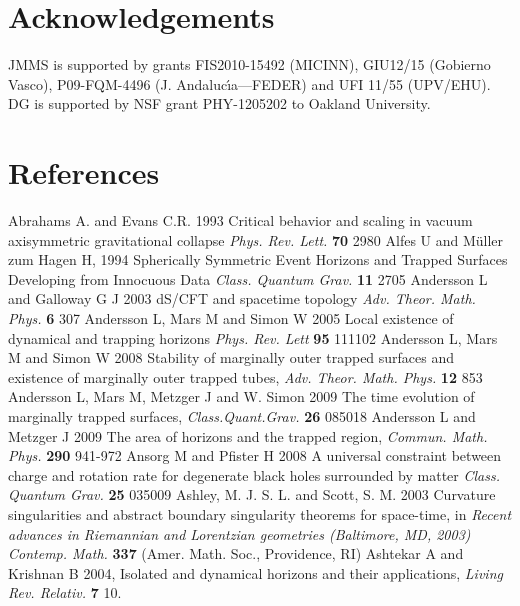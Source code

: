 \documentclass[12pt]{iopart}
\begin{document}
 



\section*{Acknowledgements}
 JMMS is supported by grants
FIS2010-15492 (MICINN), GIU12/15 (Gobierno Vasco), P09-FQM-4496 (J. Andaluc\'{\i}a---FEDER) and UFI 11/55 (UPV/EHU).
DG is supported by NSF grant PHY-1205202 to Oakland University.

\section*{References}
\begin{thebibliography}{999}

 Abrahams A. and Evans C.R. 1993 Critical behavior and scaling in vacuum axisymmetric gravitational collapse {\it Phys. Rev. Lett.} {\bf 70} 2980
 Alfes U and M\"uller zum Hagen H, 1994 Spherically Symmetric Event 
Horizons and Trapped Surfaces Developing from Innocuous Data
{\it Class. Quantum Grav.} {\bf 11} 2705
 Andersson L and Galloway G J 2003 dS/CFT and spacetime topology {\it Adv. Theor. Math. Phys.}
{\bf 6} 307%
 Andersson L, Mars M and Simon W 2005 Local existence of dynamical and trapping horizons {\it Phys. Rev. Lett} {\bf 95} 111102
 Andersson L, Mars M and Simon W 2008 Stability of marginally outer trapped surfaces and existence of marginally outer trapped tubes, {\it Adv. Theor. Math. Phys.} {\bf 12} 853 
  Andersson L,  Mars M, Metzger J and W. Simon 2009 The time evolution of marginally trapped surfaces, {\it Class.Quant.Grav.} {\bf 26} 085018%
 Andersson L and Metzger J 2009 The area of horizons and the trapped region, 
{\it Commun. Math. Phys.} {\bf 290} 941-972
 Ansorg M and Pfister H 2008 A universal constraint between charge and rotation rate for degenerate black holes surrounded by matter {\it Class. Quantum Grav.} {\bf 25} 035009
 Ashley, M. J. S. L. and Scott, S. M. 2003 Curvature singularities and abstract boundary singularity theorems for space-time, in {\it Recent advances in Riemannian and Lorentzian geometries (Baltimore, MD, 2003)} {\it Contemp. Math.} {\bf 337} (Amer. Math. Soc., Providence, RI)
 Ashtekar A and Krishnan B 2004, Isolated and dynamical horizons and their applications, {\it  Living Rev. Relativ.} {\bf 7} 10.%

\end{thebibliography}
\end{document}
